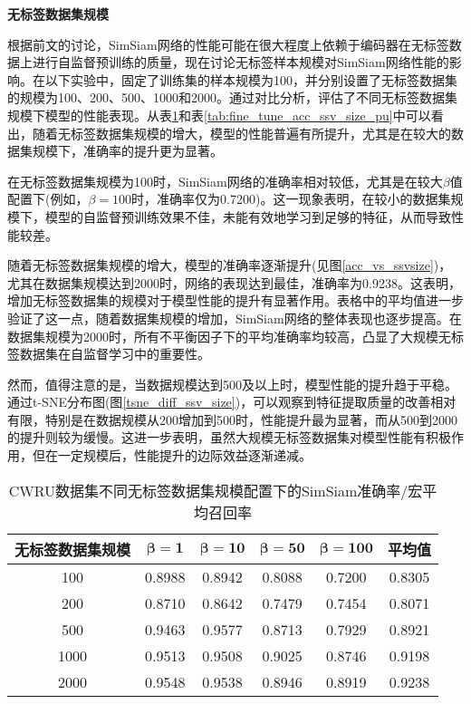 \documentclass[master]{thesis-uestc}
\begin{document}
\textbf{无标签数据集规模}

根据前文的讨论，SimSiam网络的性能可能在很大程度上依赖于编码器在无标签数据上进行自监督预训练的质量，现在讨论无标签样本规模对SimSiam网络性能的影响。在以下实验中，固定了训练集的样本规模为100，并分别设置了无标签数据集的规模为100、200、500、1000和2000。通过对比分析，评估了不同无标签数据集规模下模型的性能表现。从表\ref{tab:fine_tune_acc_ssv_size}和表\ref{tab:fine_tune_acc_ssv_size_pu}中可以看出，随着无标签数据集规模的增大，模型的性能普遍有所提升，尤其是在较大的数据集规模下，准确率的提升更为显著。

在无标签数据集规模为100时，SimSiam网络的准确率相对较低，尤其是在较大$\beta$值配置下(例如，$\beta=100$时，准确率仅为0.7200)。这一现象表明，在较小的数据集规模下，模型的自监督预训练效果不佳，未能有效地学习到足够的特征，从而导致性能较差。

随着无标签数据集规模的增大，模型的准确率逐渐提升(见图\ref{acc_vs_ssvsize})，尤其在数据集规模达到2000时，网络的表现达到最佳，准确率为0.9238。这表明，增加无标签数据集的规模对于模型性能的提升有显著作用。表格中的平均值进一步验证了这一点，随着数据集规模的增加，SimSiam网络的整体表现也逐步提高。在数据集规模为2000时，所有不平衡因子下的平均准确率均较高，凸显了大规模无标签数据集在自监督学习中的重要性。

然而，值得注意的是，当数据规模达到500及以上时，模型性能的提升趋于平稳。通过t-SNE分布图(图\ref{tsne_diff_ssv_size})，可以观察到特征提取质量的改善相对有限，特别是在数据规模从200增加到500时，性能提升最为显著，而从500到2000的提升则较为缓慢。这进一步表明，虽然大规模无标签数据集对模型性能有积极作用，但在一定规模后，性能提升的边际效益逐渐递减。

\begin{table}[h]
    \centering
    \caption{CWRU数据集不同无标签数据集规模配置下的SimSiam准确率/宏平均召回率}
    \begin{tabular}{cccccc}
    \toprule
    无标签数据集规模 & $\boldsymbol{\beta=1}$ & $\boldsymbol{\beta=10}$ & $\boldsymbol{\beta=50}$ & $\boldsymbol{\beta=100}$ & \textbf{平均值} \\
    \midrule
    100   & 0.8988 & 0.8942 & 0.8088 & 0.7200 & 0.8305 \\
    200   & 0.8710 & 0.8642 & 0.7479 & 0.7454 & 0.8071 \\
    500   & 0.9463 & 0.9577 & 0.8713 & 0.7929 & 0.8921 \\
    1000  & 0.9513 & 0.9508 & 0.9025 & 0.8746 & 0.9198 \\
    2000  & 0.9548 & 0.9538 & 0.8946 & 0.8919 & 0.9238 \\
    \bottomrule
    \end{tabular}
    \label{tab:fine_tune_acc_ssv_size}
\end{table}
\end{document}
